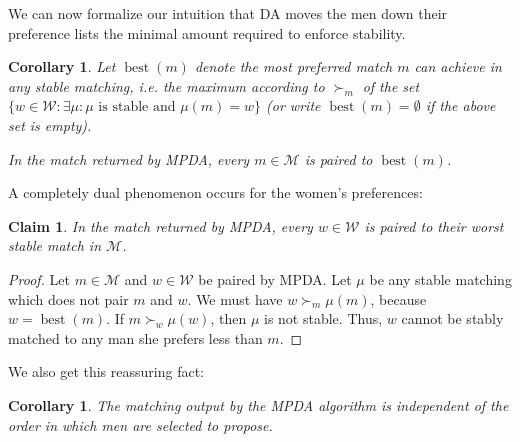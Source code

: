 \documentclass[12pt]{article}
\DeclareMathOperator*{\best}{best}
\newcommand{\M}{\mathcal{M}}
\newcommand{\W}{\mathcal{W}}
\newtheorem{corollary}[definition]{Corollary}
\newtheorem{claim}[definition]{Claim}
\begin{document}
  We can now formalize our intuition that DA moves the men down their preference
  lists the minimal amount required to enforce stability.

  \begin{corollary}\label{claimMenBestStable}
    Let $\best(m)$ denote the most preferred match $m$ can achieve in any stable
    matching, i.e. the maximum according to $\succ_m$ of the set
    $\{w\in \W: \exists \mu:\text{$\mu$ is stable and $\mu(m)=w$}\}$
    (or write $\best(m)=\emptyset$ if the above set is empty).

    In the match returned by MPDA, every $m\in \M$ is paired to $\best(m)$.
  \end{corollary}

  A completely dual phenomenon occurs for the women's preferences:
  \begin{claim}\label{claimWomenWorstStable}
    In the match returned by MPDA, every $w\in \W$ is paired to their worst stable
    match in $\M$.
  \end{claim}
  \begin{proof}
    Let $m\in \M$ and $w\in \W$ be paired by MPDA.
    Let $\mu$ be any stable matching which does not pair $m$ and $w$.
    We must have $w \succ_m \mu(m)$, because $w=\best(m)$.
    If $m \succ_w \mu(w)$, then $\mu$ is not stable.
    Thus, $w$ cannot be stably matched to any man she prefers less than $m$.
  \end{proof}

  We also get this reassuring fact:
  \begin{corollary}
    The matching output by the MPDA algorithm is independent of the order in which
    men are selected to propose.
  \end{corollary}
\end{document}
